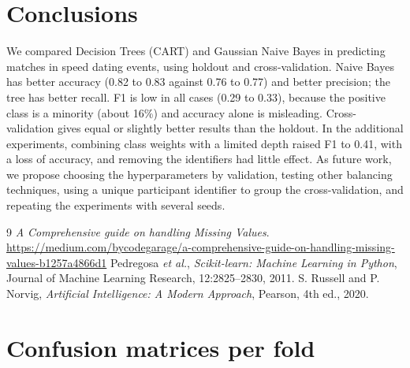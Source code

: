 \documentclass[12pt,a4paper]{article}
\begin{document}
\clearpage
\section{Conclusions}

We compared Decision Trees (CART) and Gaussian Naive Bayes in predicting matches in speed dating events, using holdout and cross-validation. Naive Bayes has better accuracy (0.82 to 0.83 against 0.76 to 0.77) and better precision; the tree has better recall. F1 is low in all cases (0.29 to 0.33), because the positive class is a minority (about 16\%) and accuracy alone is misleading. Cross-validation gives equal or slightly better results than the holdout. In the additional experiments, combining class weights with a limited depth raised F1 to 0.41, with a loss of accuracy, and removing the identifiers had little effect. As future work, we propose choosing the hyperparameters by validation, testing other balancing techniques, using a unique participant identifier to group the cross-validation, and repeating the experiments with several seeds.

\begin{thebibliography}{9}
 \emph{A Comprehensive guide on handling Missing Values}. \url{https://medium.com/bycodegarage/a-comprehensive-guide-on-handling-missing-values-b1257a4866d1}\hfill\null
{} Pedregosa \emph{et al.}, \emph{Scikit-learn: Machine Learning in Python}, Journal of Machine Learning Research, 12:2825--2830, 2011.
 S. Russell and P. Norvig, \emph{Artificial Intelligence: A Modern Approach}, Pearson, 4th ed., 2020.
\end{thebibliography}

\clearpage
\appendix
\section{Confusion matrices per fold}
\label{app:cm}
\end{document}
